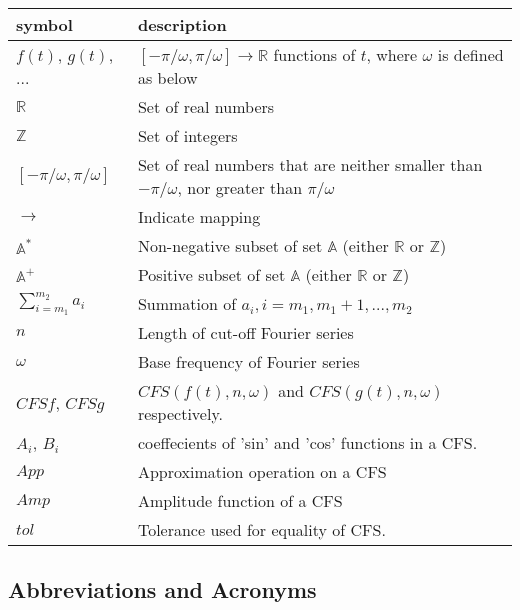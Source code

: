 \documentclass[12pt]{article}
\begin{document}
\renewcommand{\arraystretch}{1.2}
\noindent \begin{longtable*}{l l} \toprule
\textbf{symbol} & \textbf{description}\\
\midrule 
$f(t)$, $g(t)$, ... & $[-\pi/\omega, \pi/\omega]\rightarrow\mathbb{R}$ 
functions of $t$, where $\omega$ is defined as below\\
$\mathbb{R}$ & Set of real numbers\\
$\mathbb{Z}$ & Set of integers\\
$[-\pi/\omega, \pi/\omega]$ & Set of real numbers that are neither smaller 
than $-\pi/\omega$, nor greater than $\pi/\omega$ \\
$\rightarrow$ & Indicate mapping\\
$\mathbb{A}^{*}$ & Non-negative subset of set $\mathbb{A}$ (either $\mathbb{R}$ 
or $\mathbb{Z}$)\\
$\mathbb{A}^{+}$ & Positive subset of set $\mathbb{A}$ (either $\mathbb{R}$ 
or $\mathbb{Z}$)\\
$\sum_{i=m_1}^{m_2}a_i$ & Summation of $a_i, i=m_1, m_1+1, ..., m_2$\\
$n$ & Length of cut-off Fourier series\\ 
$\omega$ & Base frequency of Fourier series \\
$\mathit{CFSf}$, $\mathit{CFSg}$ & $\mathit{CFS}(f(t), n, \omega)$ and 
$\mathit{CFS}(g(t), n, \omega)$ respectively.\\
$A_i$, $B_i$& coeffecients of 'sin' and 'cos' functions in a CFS.\\
$\mathit{App}$& Approximation operation on a CFS\\
$\mathit{Amp}$& Amplitude function of a CFS\\
$\mathit{tol}$& Tolerance used for equality of CFS.\\
\bottomrule
\end{longtable*}

\subsection{Abbreviations and Acronyms}
\end{document}
